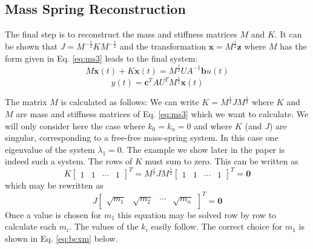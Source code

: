 \documentclass{beamer}
\begin{document}
\subsection{Mass Spring Reconstruction}
\begin{frame}
The final step is to reconstruct the mass and stiffness matrices $M$ and $K$.
It can be shown that $J =  M^{-\frac{1}{2}} K M^{-\frac{1}{2}}$ and the transformation $\mathbf{x} = M^{\frac{1}{2}} \mathbf{z}$ where $M$ has the form given in Eq. \ref{eq:ms3} leads to the final system:
\begin{equation}
M \ddot{\mathbf{x}}(t) + K \mathbf{x}(t) = M^{\frac{1}{2}} U A^{-1} \mathbf{b} u(t)
\label{eq:fin1}
\end{equation}
\begin{equation}
y(t) = \mathbf{c}^T  A U^T M^{\frac{1}{2}}\mathbf{x}(t)
\label{eq:fin2}
\end{equation}

The matrix $M$ is calculated as follows: We can write $K = M^{\frac{1}{2}} J M^{\frac{1}{2}}$ where $K$ and $M$ are mass and stiffness matrices of Eq. \ref{eq:ms3} which we want to calculate.
We will only consider here the case where $k_0 = k_n = 0$ and where $K$ (and $J$) are singular, corresponding to a free-free mass-spring system.
In this case one eigenvalue of the system $\lambda_1 = 0$.
The example we show later in the paper is indeed such a system.
The rows of $K$ must sum to zero. This can be written as
\begin{equation}
K \begin{bmatrix} 1 & 1 & \cdots & 1 \end{bmatrix}^T =  M^{\frac{1}{2}} J M^{\frac{1}{2}} \begin{bmatrix} 1 & 1 & \cdots & 1 \end{bmatrix}^T = \mathbf{0}
\end{equation} 
which may be rewritten as
\begin{equation}
J \begin{bmatrix} \sqrt{m_1} & \sqrt{m_2} & \cdots & \sqrt{m_n} \end{bmatrix}^T = \mathbf{0}
\end{equation}
Once a value is chosen for $m_1$ this equation may be solved row by row to calculate each $m_i$.
The values of the $k_i$ easily follow.
The correct choice for $m_1$ is shown in Eq. \ref{eq:bcxm} below.
\end{frame}
\end{document}
